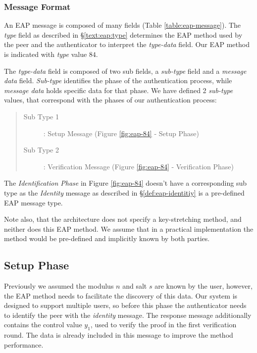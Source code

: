 \subsubsection{Message Format}
An EAP message is composed of many fields (Table \ref{table:eap-message}).
The \textit{type} field as described in \S\ref{text:eap:type} determines the EAP method used by the peer and the authenticator to interpret the \textit{type-data} field.
Our EAP method is indicated with \textit{type} value $84$.

The \textit{type-data} field is composed of two sub fields, a \textit{sub-type} field and a \textit{message data} field.
\textit{Sub-type} identifies the phase of the authentication process, while \textit{message data} holds specific data for that phase.
We have defined 2 \textit{sub-type} values, that correspond with the phases of our authentication process:

\begin{quote}
	\begin{description}
		\item [Sub Type 1]: Setup Message (Figure \ref{fig:eap-84} - Setup Phase)
		\item [Sub Type 2]: Verification Message (Figure \ref{fig:eap-84} - Verification Phase)
	\end{description}
\end{quote}

The \textit{Identification Phase} in Figure \ref{fig:eap-84} doesn't have a corresponding sub type as the \textit{Identity} message as described in \S\ref{def:eap-identitiy} is a pre-defined EAP message type.

Note also, that the architecture does not specify a key-stretching method, and neither does this EAP method.
We assume that in a practical implementation the method would be pre-defined and implicitly known by both parties.

\subsection{Setup Phase}
Previously we assumed the modulus $n$ and salt $s$ are known by the user, however, the EAP method needs to facilitate the discovery of this data.
Our system is designed to support multiple users, so before this phase the authenticator needs to identify the peer with the \textit{identity} message.
The response message additionally contains the control value $y_1$, used to verify the proof in the first verification round. The data is already included in this message to improve the method performance.

